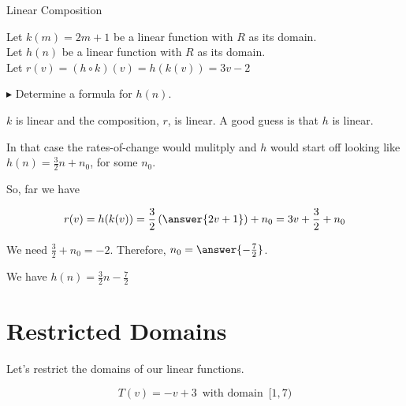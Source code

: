 \documentclass{ximera}
\begin{document}
\begin{example} Linear Composition

Let $k(m) = 2 m + 1$ be a linear function with \textbf{$R$} as its domain. \\
Let $h(n)$ be a linear function with \textbf{$R$} as its domain. \\


Let $r(v) = (h \circ k)(v) = h(k(v)) = 3 v - 2$ 

$\blacktriangleright$  Determine a formula for $h(n)$.




\begin{explanation}


$k$ is linear and the composition, $r$, is linear. A good guess is that $h$ is linear.  

In that case the rates-of-change would mulitply and $h$ would start off looking like $h(n) = \frac{3}{2} n + n_0$, for some $n_0$.


So, far we have 

\[   r(v) = h(k(v)) = \frac{3}{2} \left( \answer{2 v + 1} \right) + n_0 =  3 v + \frac{3}{2} + n_0\]


We need $\frac{3}{2} + n_0 = -2$.  Therefore, $n_0 = \answer{-\frac{7}{2}}$.


We have $h(n) = \frac{3}{2} n - \frac{7}{2}$


\end{explanation}
\end{example}








\section{Restricted Domains}


Let's restrict the domains of our linear functions.









\[  T(v) = -v+3  \, \text{ with domain } \,  [1,7)   \]
\end{document}
